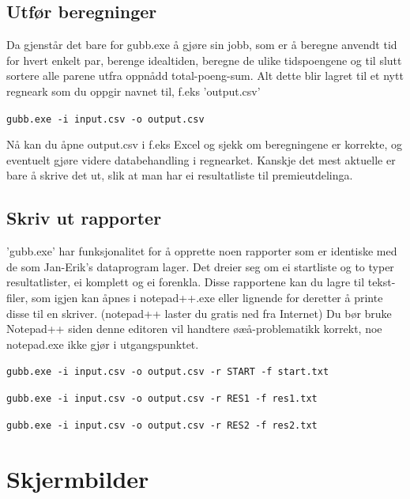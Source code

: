 \documentclass[12pt]{book}
\begin{document}
\newpage

\section{Utfør beregninger}

Da gjenstår det bare for gubb.exe å gjøre sin jobb, som er å beregne anvendt tid for hvert enkelt par, berenge idealtiden, beregne de ulike tidspoengene og til slutt sortere alle parene utfra oppnådd total-poeng-sum. Alt dette blir lagret til et nytt regneark som du oppgir navnet til, f.eks 'output.csv'

\begin{alltt}
\texttt{gubb.exe -i input.csv -o output.csv  {\Return} }
\end{alltt}

Nå kan du åpne output.csv i f.eks Excel og sjekk om beregningene er korrekte, og eventuelt gjøre videre databehandling i regnearket. Kanskje det mest aktuelle er bare å skrive det ut, slik at man har ei resultatliste til premieutdelinga.

\section{Skriv ut rapporter}

'gubb.exe' har funksjonalitet for å opprette noen rapporter som er identiske med de som Jan-Erik's dataprogram lager. Det dreier seg om ei startliste og to typer resultatlister, ei komplett og ei forenkla. Disse rapportene kan du lagre til tekst-filer, som igjen kan åpnes i notepad++.exe eller lignende for deretter å printe disse til en skriver. (notepad++ laster du gratis ned fra Internet) Du bør bruke Notepad++ siden denne editoren vil handtere øæå-problematikk korrekt, noe notepad.exe ikke gjør i utgangspunktet.

\begin{alltt}
\texttt{gubb.exe -i input.csv -o output.csv -r START -f start.txt  {\Return} }

\texttt{gubb.exe -i input.csv -o output.csv -r RES1 -f res1.txt  {\Return} }

\texttt{gubb.exe -i input.csv -o output.csv -r RES2 -f res2.txt  {\Return} }
\end{alltt}

\appendix
\chapter{Skjermbilder}
\end{document}
